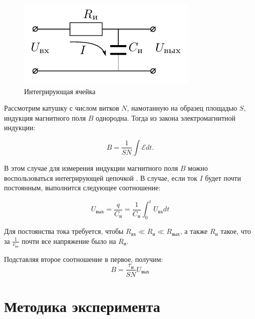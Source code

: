 \begin{figure}
	\vspace{-10pt}
	\includegraphics[width=\linewidth]{../res/integr.png}
	\caption{Интегрирующая ячейка}
	\label{img:integr}
	\vspace{10pt}
\end{figure}

Рассмотрим катушку с числом витков $N$, намотанную на образец площадью $S$, индукция магнитного поля $B$ однородна. Тогда из закона электромагнитной индукции:

$$ B = \frac{1}{SN} \int \mathcal{E} dt. $$

В этом случае для измерения индукции магнитного поля $B$ можно воспользоваться интегрирующей цепочкой . В случае, если ток $I$ будет почти постоянным, выполнится следующее соотношение:

$$ U_{\text{вых}} = \frac{q}{C_{\text{и}}} = \frac{1}{C_{\text{и}}} \int_{0}^{t} U_{\text{вх}} dt $$

Для постоянства тока требуется, чтобы $R_{\text{вх}} \ll R_{\text{и}} \ll R_{\text{вых}}$, а также $R_{\text{и}}$ такое, что за $\frac{1}{\nu_{\text{вх}}}$ почти все напряжение было на $R_{\text{и}}$.

Подставляя второе соотношение в первое, получим:
\begin{equation}
	B = \frac{\tau_{\text{и}}}{SN} U_{\text{вых}}
	\label{eq:B_circuit}
\end{equation}

\section*{Методика эксперимента}


